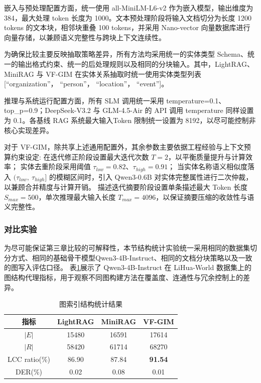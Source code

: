 \documentclass[promaster, vlined]{DissertUESTC}
\begin{document}
嵌入与预处理配置方面，统一使用 all-MiniLM-L6-v2\cite{reimers2019sentence} 作为嵌入模型，输出维度为 384，最大处理 token 长度为 1000。文本预处理阶段将输入文档切分为长度 1200 tokens 的文本块，相邻块重叠 100 tokens，并采用 Nano-vector 向量数据库进行向量存储，以兼顾语义完整性与跨块上下文连续性。

为确保比较主要反映抽取策略差异，所有方法均采用统一的实体类型 Schema、统一的输出格式约束、统一的后处理规则以及相同的分块输入。其中，LightRAG、MiniRAG 与 VF-GIM 在实体关系抽取时统一使用实体类型列表 [“organization”， “person”， “location”， “event”]。

推理与系统运行配置方面，所有 SLM 调用统一采用 temperature=0.1、top\_p=0.9；DeepSeek-V3.2 与 GLM-4.5-Air 的 API 调用 temperature 同样设置为 0.1。各基线 RAG 系统最大输入Token 限制统一设置为 8192，以尽可能控制非核心实现差异。

对于 VF-GIM，除共享上述通用配置外，其余参数主要依据工程经验与上下文预算约束设定:
在迭代修正阶段设置最大迭代次数 $T=2$，以平衡质量提升与计算效率；
实体去重阶段采用阈值 $\tau_{low}=0.82$、$\tau_{high}=0.91$；
当实体名称语义相似度落入 $(\tau_{low},\ \tau_{high}]$ 的模糊区间时，引入 Qwen3-0.6B 对实体完整属性进行二次仲裁，以兼顾合并精度与计算开销。
描述迭代摘要阶段设置单条描述最大 Token 长度 $S_{max}=500$，单次推理最大输入长度 $T_{max}=4096$，以保证摘要压缩的收敛性与语义完整性。

\subsubsection{对比实验}

为尽可能保证第三章比较的可解释性，本节结构统计实验统一采用相同的数据集切分方式、相同的基础骨干模型Qwen3-4B-Instruct、相同的文档分块策略以及一致的图写入评估口径。
表\ref{tab:graph_structure_stats}展示了 Qwen3-4B-Instruct 在 LiHua-World 数据集上的图结构代理指标，用于观察不同图构建方法在覆盖度、连通性与冗余控制上的差异。

\begin{table}[!ht]
\centering
\caption{图索引结构统计结果}
\label{tab:graph_structure_stats}
\begin{tabular*}{\textwidth}{@{\extracolsep{\fill}}cccc}
\toprule
\textbf{指标} & \textbf{LightRAG} & \textbf{MiniRAG} & \textbf{VF-GIM} \\
\midrule
$|E|$ & 15480 & 16591 & 17614 \\
$|R|$ & 58420 & 61714 & 68270 \\
LCC ratio(\%) & 86.90 & 87.84 & \textbf{91.54} \\
DER(\%) & 0.02 & 0.08 & 0.01 \\
\bottomrule
\end{tabular*}
\end{table}
\end{document}
